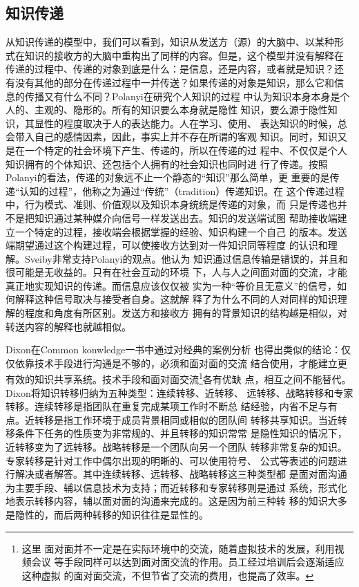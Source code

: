 \documentclass[12pt,a4paper]{Ctexart}
\begin{document}
\subsection{知识传递}
从知识传递的模型中，我们可以看到，知识从发送方（源）的大脑中、以某种形
式在知识的接收方的大脑中重构出了同样的内容。但是，这个模型并没有解释在
传递的过程中、传递的对象到底是什么：是信息，还是内容，或者就是知识？还
有没有其他的部分在传递过程中一并传送？如果传递的对象是知识，那么它和信
息的传播又有什么不同？Polanyi\cite{polanyi1998pkt}在研究个人知识的过程
中认为知识本身本身是个人的、主观的、隐形的。所有的知识要么本身就是隐性
知识，要么源于隐性知识，其显性的程度取决于人的表达能力。人在学习、使用、
表达知识的时候，总会带入自己的感情因素，因此，事实上并不存在所谓的客观
知识。同时，知识又是在一个特定的社会环境下产生、传递的，所以在传递的过
程中、不仅仅是个人知识拥有的个体知识、还包括个人拥有的社会知识也同时进
行了传递。按照Polanyi的看法，传递的对象远不止一个静态的“知识”那么简单，更
重要的是传递“认知的过程”，他称之为通过“传统”（tradition）传递知识。在
这个传递过程中，行为模式、准则、价值观以及知识本身统统是传递的对象，而
只是传递也并不是把知识通过某种媒介向信号一样发送出去。知识的发送端试图
帮助接收端建立一个特定的过程，接收端会根据掌握的经验、知识构建一个自己
的版本。发送端期望通过这个构建过程，可以使接收方达到对一件知识同等程度
的认识和理解。Sveiby\cite{sveiby1996tka}非常支持Polanyi的观点。他认为
知识通过信息传输是错误的，并且和很可能是无收益的。只有在社会互动的环境
下，人与人之间面对面的交流，才能真正地实现知识的传递。而信息应该仅仅被
实为一种“等价且无意义”的信号，如何解释这种信号取决与接受者自身。这就解
释了为什么不同的人对同样的知识理解的程度和角度有所区别。发送方和接收方
拥有的背景知识的结构越是相似，对转送内容的解释也就越相似。

Dixon\cite{dixon2000ckc}在Common konwledge一书中通过对经典的案例分析
也得出类似的结论：仅仅依靠技术手段进行沟通是不够的，必须和面对面的交流
结合使用，才能建立更有效的知识共享系统。技术手段和面对面交流\footnote{这里
  面对面并不一定是在实际环境中的交流，随着虚拟技术的发展，利用视频会议
  等手段同样可以达到面对面交流的作用。员工经过培训后会逐渐适应这种虚拟
  的面对面交流，不但节省了交流的费用，也提高了效率。}各有优缺
点，相互之间不能替代。Dixon将知识转移归纳为五种类型：连续转移、近转移、
远转移、战略转移和专家转移。连续转移是指团队在重复完成某项工作时不断总
结经验，内省不足与有点。近转移是指工作环境于成员背景相同或相似的团队间
转移共享知识。当近转移条件下任务的性质变为非常规的、并且转移的知识常常
是隐性知识的情况下，近转移变为了远转移。战略转移是一个团队向另一个团队
转移非常复杂的知识。专家转移是针对工作中偶尔出现的明晰的、可以使用符号、
公式等表述的问题进行解决或者解答。其中连续转移、远转移、战略转移这三种类型都
是面对面沟通为主要手段、辅以信息技术为支持；而近转移和专家转移则是通过
系统，形式化地表示转移内容，辅以面对面的沟通来完成的。这是因为前三种转
移的知识大多是隐性的，而后两种转移的知识往往是显性的。
\end{document}
